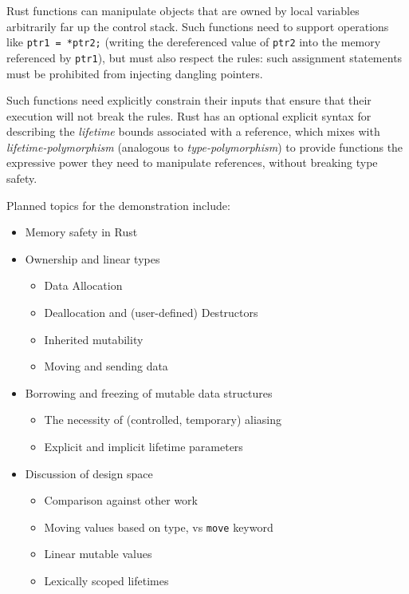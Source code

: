 \documentclass{acm_proc_article-sp}
\begin{document}
Rust functions can manipulate objects that are owned by local
variables arbitrarily far up the control stack.  Such functions need to
support operations like {\tt *ptr1 = *ptr2;} (writing the dereferenced
value of {\tt ptr2} into the memory referenced by {\tt ptr1}), but must
also respect the rules: such assignment statements
must be prohibited from injecting dangling pointers.

Such functions need explicitly constrain their inputs
that ensure that their execution will not break the rules.
%
Rust has an optional explicit syntax for describing the {\em lifetime}
bounds associated with a reference, which mixes with {\em
  lifetime-polymorphism} (analogous to {\em type-polymorphism}) to
provide functions the expressive power they need to manipulate
references, without breaking type safety.

Planned topics for the demonstration include:
\begin{itemize}
\item Memory safety in Rust
\item Ownership and linear types
\begin{itemize}
\item Data Allocation
\item Deallocation and (user-defined) Destructors
\item Inherited mutability
\item Moving and sending data
\end{itemize}
\item Borrowing and freezing of mutable data structures
\begin{itemize}
\item The necessity of (controlled, temporary) aliasing
\item Explicit and implicit lifetime parameters
\end{itemize}
\item Discussion of design space
\begin{itemize}
\item Comparison against other work
\item Moving values based on type, vs {\tt move} keyword
\item Linear mutable values
\item Lexically scoped lifetimes
\end{itemize}
\end{itemize}
\end{document}
